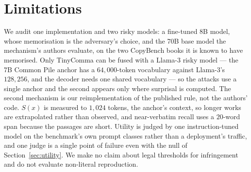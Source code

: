\section{Limitations}\label{sec:limitations}
We audit one implementation and two risky models: a fine-tuned 8B model, whose memorisation is the adversary's choice, and the 70B base model the mechanism's authors evaluate, on the two CopyBench books it is known to have memorised. Only TinyComma can be fused with a Llama-3 risky model --- the 7B Common Pile anchor has a $64{,}000$-token vocabulary against Llama-3's $128{,}256$, and the decoder needs one shared vocabulary --- so the attacks use a single anchor and the second appears only where surprisal is computed. The second mechanism is our reimplementation of the published rule, not the authors' code. $S(x)$ is measured to $1{,}024$ tokens, the anchor's context, so longer works are extrapolated rather than observed, and near-verbatim recall uses a $20$-word span because the passages are short. Utility is judged by one instruction-tuned model on the benchmark's own prompt classes rather than a deployment's traffic, and one judge is a single point of failure even with the null of Section~\ref{sec:utility}. We make no claim about legal thresholds for infringement and do not evaluate non-literal reproduction.
